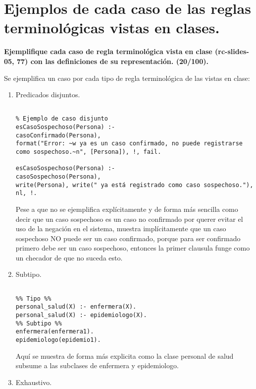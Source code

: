 \documentclass[11pt, letterpaper]{article}
\begin{document}
\newpage
	
\section{Ejemplos de cada caso de las reglas terminológicas vistas en clases.}
	
	\textbf{Ejemplifique cada caso de regla terminológica vista en clase (rc-slides-05,
	77) con las definiciones de su representación. (20/100).}
	
	Se ejemplifica un caso por cada tipo de regla terminológica de las vistas en clase:
	
	\begin{enumerate}
		\item Predicados disjuntos.
		
\begin{verbatim}
	
% Ejemplo de caso disjunto	
esCasoSospechoso(Persona) :-
casoConfirmado(Persona),
format("Error: ~w ya es un caso confirmado, no puede registrarse como sospechoso.~n", [Persona]), !, fail.

esCasoSospechoso(Persona) :-
casoSospechoso(Persona), 
write(Persona), write(" ya está registrado como caso sospechoso."), nl, !.
\end{verbatim}

Pese a que no se ejemplifica explícitamente y de forma más sencilla como decir que un caso sospechoso es un caso no confirmado por querer evitar el uso de la negación en el sistema, muestra implícitamente que un caso sospechoso NO puede ser un caso confirmado, porque para ser confirmado primero debe ser un caso sospechoso, entonces la primer clausula funge como un checador de que no suceda esto.


		\item		Subtipo.
				
\begin{verbatim}
	
%% Tipo %%
personal_salud(X) :- enfermera(X).
personal_salud(X) :- epidemiologo(X).
%% Subtipo %%
enfermera(enfermera1).
epidemiologo(epidemio1).
\end{verbatim}	

Aquí se muestra de forma más explicita como la clase personal de salud subsume a las subclases de enfermera y epidemiologo.

\newpage

		\item		Exhaustivo.

\begin{verbatim}
	

\end{verbatim}
\end{enumerate}
\end{document}
